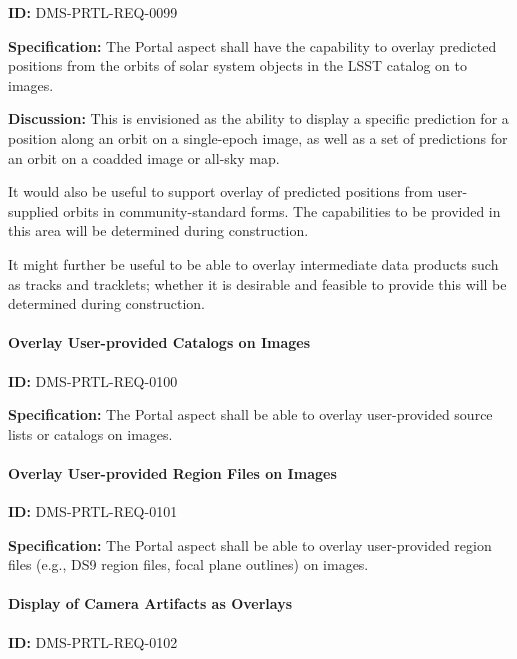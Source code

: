 \documentclass[SE,toc,lsstdraft]{lsstdoc}
\begin{document}
\label{DMS-PRTL-REQ-0099}
\textbf{ID:} DMS-PRTL-REQ-0099

\textbf{Specification:}
The Portal aspect shall have the capability to overlay predicted positions from the orbits of 	solar system objects in the LSST catalog on to images.

\textbf{Discussion:}
This is envisioned as the ability to display a specific prediction for a position along an orbit on a single-epoch image, as well as a set of predictions for an orbit on a coadded image or all-sky map.

It would also be useful to support overlay of predicted positions from user-supplied orbits in community-standard forms.  The capabilities to be provided in this area will be determined during construction.

It might further be useful to be able to overlay intermediate data products such as tracks and tracklets; whether it is desirable and feasible to provide this will be determined during construction.

\paragraph{Overlay User-provided Catalogs on Images}\hfill  %

\label{DMS-PRTL-REQ-0100}
\textbf{ID:} DMS-PRTL-REQ-0100

\textbf{Specification:}
The Portal aspect shall be able to overlay user-provided source lists or catalogs on images.

\paragraph{Overlay User-provided Region Files on Images}\hfill  %

\label{DMS-PRTL-REQ-0101}
\textbf{ID:} DMS-PRTL-REQ-0101

\textbf{Specification:}
The Portal aspect shall be able to overlay user-provided region files (e.g., DS9 region files, focal plane outlines) on images.

\paragraph{Display of Camera Artifacts as Overlays}\hfill  %

\label{DMS-PRTL-REQ-0102}
\textbf{ID:} DMS-PRTL-REQ-0102
\end{document}
